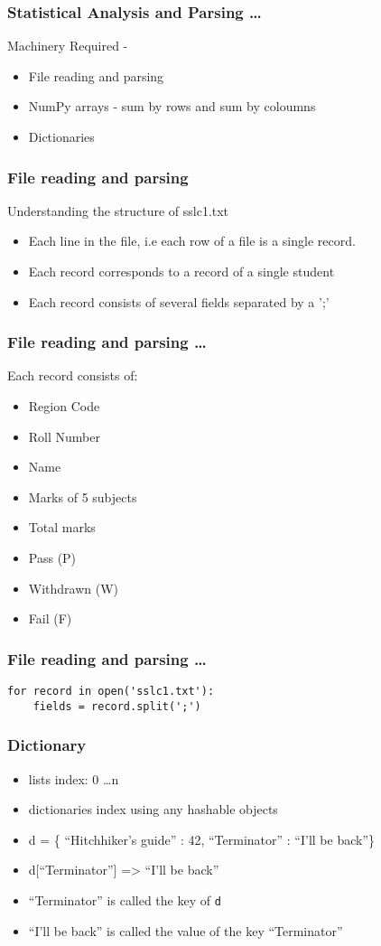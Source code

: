 \documentclass[14pt,compress]{beamer}
\newcommand{\typ}[1]{\lstinline{#1}}
\begin{document}
\begin{frame}
  \frametitle{Statistical Analysis and Parsing \ldots}
  Machinery Required -
  \begin{itemize}
    \item File reading and parsing
    \item NumPy arrays - sum by rows and sum by coloumns
    \item Dictionaries
  \end{itemize}
\end{frame}

\begin{frame}
  \frametitle{File reading and parsing}
  Understanding the structure of sslc1.txt
  \begin{itemize}
    \item Each line in the file, i.e each row of a file is a single record.
    \item Each record corresponds to a record of a single student
    \item Each record consists of several fields separated by a ';'
  \end{itemize}
\end{frame}

\begin{frame}
  \frametitle{File reading and parsing \ldots}
  Each record consists of:
  \begin{itemize}
    \item Region Code
    \item Roll Number
    \item Name
    \item Marks of 5 subjects
    \item Total marks
    \item Pass (P)
    \item Withdrawn (W)
    \item Fail (F)
  \end{itemize}
\end{frame}

\begin{frame}[fragile]
  \frametitle{File reading and parsing \ldots}
  \begin{lstlisting}
for record in open('sslc1.txt'):
    fields = record.split(';')
  \end{lstlisting}
\end{frame}

\begin{frame}[fragile]
  \frametitle{Dictionary}
  \begin{itemize}
    \item lists index: 0 \ldots n
    \item dictionaries index using any hashable objects
    \item d = \{ ``Hitchhiker's guide'' : 42, ``Terminator'' : ``I'll be back''\}
    \item d[``Terminator''] => ``I'll be back''
    \item ``Terminator'' is called the key of \typ{d}
    \item ``I'll be back'' is called the value of the key ``Terminator''
  \end{itemize}
\end{frame}
\end{document}

